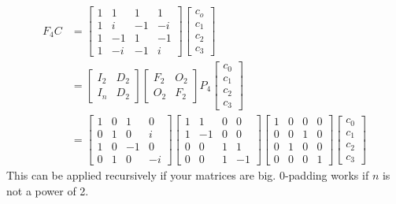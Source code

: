 \documentclass{article}
\begin{document}
    \begin{align*}
        F_4C &= \begin{bmatrix} 1&1&1&1 \\ 1&i&-1&-i \\ 1&-1&1&-1 \\ 1&-i&-1&i \end{bmatrix} \begin{bmatrix} c_o \\ c_1 \\c_2 \\ c_3 \end{bmatrix} \\
        &= \begin{bmatrix} I_2 & D_{2} \\ I_n & D_{2} \end{bmatrix} \begin{bmatrix} F_2 & O_2 \\ O_2 & F_2 \end{bmatrix} P_4 \begin{bmatrix} c_0 \\ c_1 \\ c_2 \\ c_3 \end{bmatrix} \\
        &= \begin{bmatrix} 1&0&1&0\\0&1&0&i\\1&0&-1&0\\0&1&0&-i \end{bmatrix} \begin{bmatrix} 1&1&0&0 \\ 1&-1&0&0 \\ 0&0&1&1 \\ 0&0&1&-1 \end{bmatrix} \begin{bmatrix} 1&0&0&0\\0&0&1&0\\0&1&0&0\\0&0&0&1 \end{bmatrix} \begin{bmatrix} c_0 \\ c_1 \\ c_2 \\ c_3 \end{bmatrix}
    \end{align*}
    This can be applied recursively if your matrices are big. 0-padding works if $n$ is not a power of 2.
    
\end{document}
